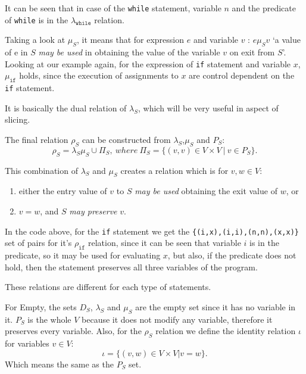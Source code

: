 \documentclass[oneside,12pt,a4paper]{book}
\begin{document}
It can be seen that in case of the \texttt{while} statement, variable $n$ and the predicate of \texttt{while} is in the $\lambda_{\texttt{while}}$ relation.

Taking a look at $\mu_S$, it means that for expression $e$ and variable $v$ : $e \mu_S v$ `a value of e in $S$ \textit{may be used} in obtaining the value of the variable $v$ on exit from $S$'. Looking at our example again, for the expression of \texttt{if} statement and variable $x$, $\mu_{\texttt{if}}$ holds, since the execution of assignments to $x$ are control dependent on the \texttt{if} statement.

It is basically the dual relation of $\lambda_S$, which will be very useful in aspect of slicing.

The final relation $\rho_S$ can be constructed from $\lambda_S$,$\mu_S$ and $P_S$:
\begin{equation}
\rho_S = \lambda_S\mu_S \cup \Pi_S,\  where \ \Pi_S = \{(v,v) \in V \times V\ |\ v \in P_S\}.
\end{equation}

This combination of $\lambda_S$ and $\mu_S$ creates a relation which is for $v,w \in V$:
\begin{enumerate}
\item either the entry value of $v$ to $S$ \textit{may be used} obtaining the exit value of $w$, or
\item $v = w$, and $S$ \textit{may preserve} $v$.
\end{enumerate}

In the code above, for the \texttt{if} statement we get the \texttt{\{(i,x),(i,i),(n,n),(x,x)\}} set of pairs for it's $\rho_{\texttt{if}}$ relation, since it can be seen that variable $i$ is in the predicate, so it may be used for evaluating $x$, but also, if the predicate does not hold, then the statement preserves all three variables of the program. 

These relations are different for each type of statements.

For Empty, the sets $D_S$, $\lambda_S$ and $\mu_S$ are the empty set since it has no variable in it. $P_S$ is the whole $V$ because it does not modify any variable, therefore it preserves every variable. Also, for the $\rho_S$ relation we define the identity relation $\iota$ for variables $v \in V$:
\begin{equation}
\iota = \{(v,w) \in V \times V | v = w\}.
\end{equation}
Which means the same as the $P_S$ set.
\end{document}
